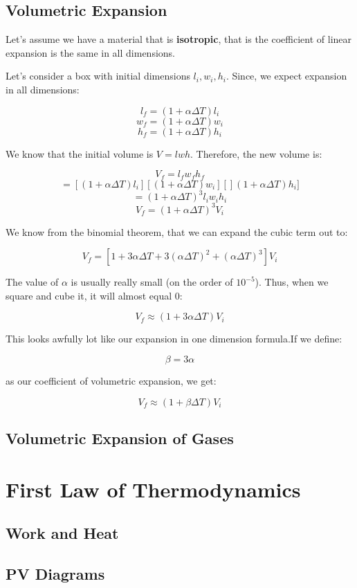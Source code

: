 \documentclass{report}
\begin{document}
\section{Volumetric Expansion}
Let's assume we have a material that is \textbf{isotropic}, that is the coefficient of linear expansion is the same in all dimensions.

Let's consider a box with initial dimensions $l_i, w_i, h_i$. Since, we expect expansion in all dimensions:

$$l_f = (1+\alpha\Delta T)l_i$$
$$w_f = (1+\alpha\Delta T)w_i$$
$$h_f = (1+\alpha\Delta T)h_i$$


We know that the initial volume is $V = lwh$. Therefore, the new volume is:

$$V_f = l_fw_fh_f$$ 
$$= [(1+\alpha\Delta T)l_i][(1+\alpha\Delta T)w_i][](1+\alpha\Delta T)h_i]$$ 
$$= (1+\alpha\Delta T)^3l_iw_ih_i$$
$$V_f = (1+\alpha\Delta T)^3V_i$$

We know from the binomial theorem, that we can expand the cubic term out to:

$$V_f =  [1+3\alpha\Delta T + 3(\alpha\Delta T)^2 + (\alpha\Delta T)^3]V_i$$

The value of $\alpha$ is usually really small (on the order of $10^{-5}$). Thus, when we square and cube it, it will almost equal 0:

$$V_f \approx  (1+3\alpha\Delta T)V_i$$

This looks awfully lot like our expansion in one dimension formula.If we define:

$$\beta = 3\alpha$$

as our coefficient of volumetric expansion, we get:

$$V_f \approx  (1+\beta\Delta T)V_i$$

\section{Volumetric Expansion of Gases}








\chapter{First Law of Thermodynamics}
\section{Work and Heat}
\section{PV Diagrams}
\end{document}

